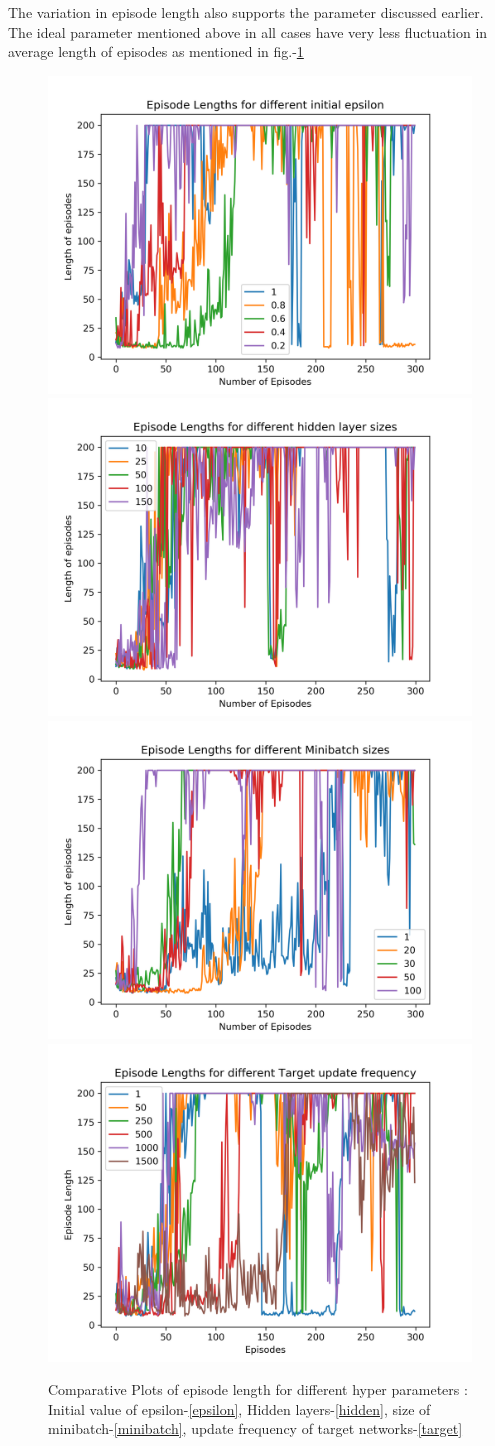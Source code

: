 \documentclass[preprint,12pt]{elsarticle}
\begin{document}
		The variation in episode length also supports the parameter discussed earlier. The ideal parameter mentioned above in all cases have very less fluctuation in average length of episodes as mentioned in fig.-\ref{fig:epi_len}
    \begin{figure}[H]
    	\centering  
    	\subfigure
    	{\includegraphics[width=0.4\linewidth]{./Episode_lengths_EPSILONs.png}\label{epsilon_len}}
    	\subfigure
    	{\includegraphics[width=0.4\linewidth]{./Episode_lengths_HiddenSizes.png}\label{hidden_len}}
    	\subfigure
    	{\includegraphics[width=0.4\linewidth]{./Episode_lengths_MINIBATCHs.png}\label{minibatch_len}}
    	\subfigure
    	{\includegraphics[width=0.4\linewidth]{./Episode_lengths_TARGETs.png}\label{target_len}}
    	\caption{Comparative Plots of episode length for different hyper parameters : Initial value of epsilon-\ref{epsilon}, Hidden layers-\ref{hidden}, size of minibatch-\ref{minibatch}, update frequency of target networks-\ref{target}}
    	\label{fig:epi_len}
    \end{figure}
    
\end{document}
